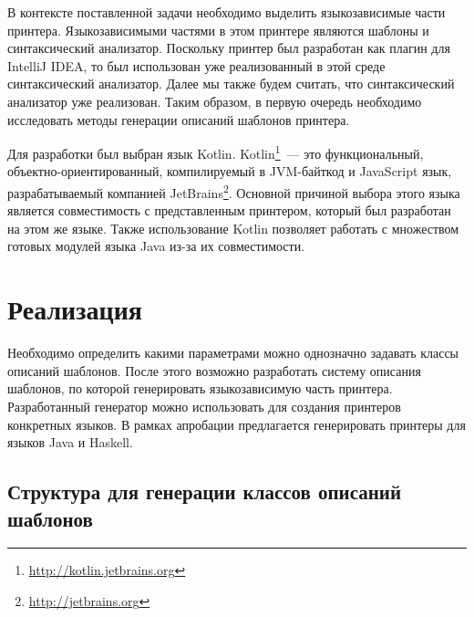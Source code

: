 В контексте поставленной задачи необходимо выделить языкозависимые части принтера. Языкозависимыми частями в этом принтере являются шаблоны и синтаксический анализатор. Поскольку принтер был разработан как плагин для IntelliJ IDEA, то был использован уже реализованный в этой среде синтаксический анализатор. Далее мы также будем считать, что синтаксический анализатор уже реализован. Таким образом, в первую очередь необходимо исследовать методы генерации описаний шаблонов принтера. 

Для разработки был выбран язык Kotlin. Kotlin\footnote{\url{http://kotlin.jetbrains.org}}~--- это функциональный, объектно-ориентированный, компилируемый в JVM-байткод и JavaScript язык, разрабатываемый компанией JetBrains\footnote{\url{http://jetbrains.org}}. Основной причиной выбора этого языка является совместимость с представленным принтером, который был разработан на этом же языке. Также использование Kotlin позволяет работать с множеством готовых модулей языка Java из-за их совместимости.  

\section{Реализация}
Необходимо определить какими параметрами можно однозначно задавать классы описаний шаблонов. После этого возможно разработать систему описания шаблонов, по которой генерировать языкозависимую часть принтера. Разработанный генератор можно использовать для создания принтеров конкретных языков. В рамках апробации предлагается генерировать принтеры для языков Java и Haskell.

\subsection{Структура для генерации классов описаний шаблонов}

